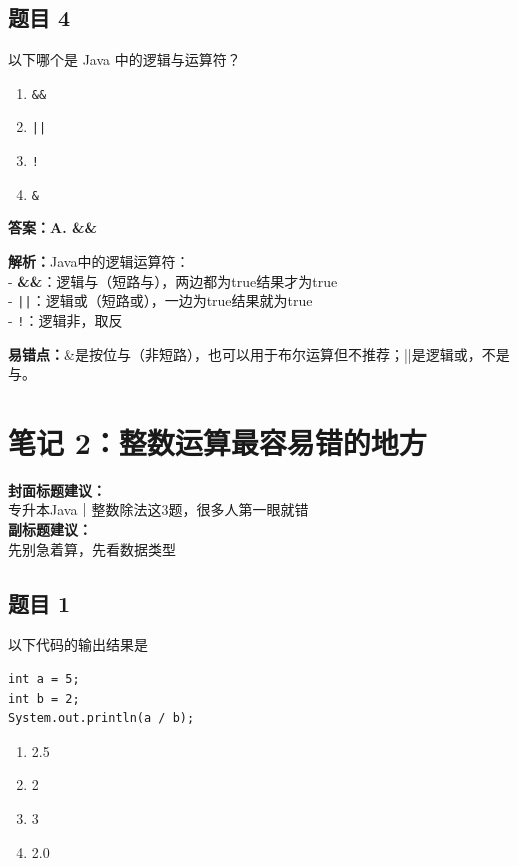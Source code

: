 \documentclass[12pt,a4paper]{ctexart}
\begin{document}
\subsection*{题目 4}
以下哪个是 Java 中的逻辑与运算符？
\begin{enumerate}[label=\Alph*.]
	\item \texttt{\&\&}
	\item \texttt{||}
	\item \texttt{!}
	\item \texttt{\&}
\end{enumerate}

\begin{answerbox}
	\textbf{答案：A. \&\&}

	\textbf{解析：}Java中的逻辑运算符：\\
	- \textbf{\&\&}：逻辑与（短路与），两边都为true结果才为true\\
	- \texttt{||}：逻辑或（短路或），一边为true结果就为true\\
	- \texttt{!}：逻辑非，取反

	\textbf{易错点：}\&是按位与（非短路），也可以用于布尔运算但不推荐；||是逻辑或，不是与。
\end{answerbox}

\newpage

\section{笔记 2：整数运算最容易错的地方}
\begin{coverbox}
	\textbf{封面标题建议：}\\
	专升本Java｜整数除法这3题，很多人第一眼就错\\
	\textbf{副标题建议：}\\
	先别急着算，先看数据类型
\end{coverbox}

\subsection*{题目 1}
以下代码的输出结果是
\begin{lstlisting}
int a = 5;
int b = 2;
System.out.println(a / b);
\end{lstlisting}

\begin{enumerate}[label=\Alph*.]
	\item 2.5
	\item 2
	\item 3
	\item 2.0
\end{enumerate}
\end{document}
